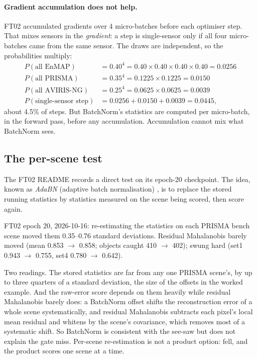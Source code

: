 \paragraph{Gradient accumulation does not help.} FT02 accumulated gradients over 4 micro-batches before each optimiser step. That mixes sensors in the
\emph{gradient}: a step is single-sensor only if all four micro-batches came from the same sensor. The draws are independent, so the probabilities multiply:
\begin{align*}
  P(\text{all EnMAP}) &= 0.40^4 = 0.40 \times 0.40 \times 0.40 \times 0.40 = 0.0256\\
  P(\text{all PRISMA}) &= 0.35^4 = 0.1225 \times 0.1225 = 0.0150\\
  P(\text{all AVIRIS-NG}) &= 0.25^4 = 0.0625 \times 0.0625 = 0.0039\\
  P(\text{single-sensor step}) &= 0.0256 + 0.0150 + 0.0039 = 0.0445,
\end{align*}
about 4.5\% of steps. But BatchNorm's statistics are computed per micro-batch, in the forward pass, before any accumulation. Accumulation cannot mix what
BatchNorm sees.

\subsection{The per-scene test}

The FT02 README records a direct test on its epoch-20 checkpoint. The idea, known as \emph{AdaBN} (adaptive batch normalisation)
\citep{li2016revisiting}, is to replace the stored running statistics by statistics measured on the scene being scored, then score again.

\begin{drift}
FT02 epoch 20, 2026-10-16:\tbrk{} re-estimating the statistics on each PRISMA bench scene moved
them 0.35--0.76 standard deviations. Residual Mahalanobis barely moved (mean 0.853 $\to$ 0.858; objects caught 410 $\to$ 402);  swung hard
(set1 0.943 $\to$ 0.755, set4 0.780 $\to$ 0.642).
\end{drift}

Two readings. The stored statistics are far from any one PRISMA scene's, by up to three quarters of a standard deviation, the size of the offsets in the
worked example. And the raw-error score depends on them heavily while residual Mahalanobis barely does: a BatchNorm offset shifts the reconstruction error
of a whole scene systematically, and residual Mahalanobis subtracts each pixel's local mean residual and whitens by the scene's covariance, which removes most
of a systematic shift. So BatchNorm is consistent with the see-saw but does not explain the gate miss. Per-scene re-estimation is not a product option:
 fell, and the product scores one scene at a time.

